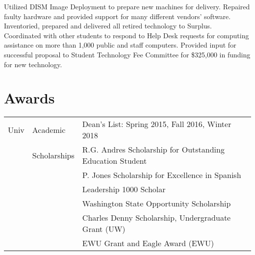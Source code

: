 \documentclass[]{deedy-resume-openfont}
\begin{document}
\begin{minipage}[t]{0.75\textwidth}
\sectionsep

Utilized DISM Image Deployment to prepare new machines for delivery. Repaired faulty hardware and provided support for many different vendors’ software. Inventoried, prepared and delivered all retired technology to Surplus. Coordinated with other students to respond to Help Desk requests for computing assistance on more than 1,000 public and staff computers. Provided input for successful proposal to Student Technology Fee Committee for \$325,000 in funding for new technology.
\sectionsep


\section{Awards} 
\begin{tabular}{rll}
Univ& Academic & Dean's List: Spring 2015, Fall 2016, Winter 2018\\
 & Scholarships & R.G. Andres Scholarship for Outstanding Education Student\\
 & & P. Jones Scholarship for Excellence in Spanish\\
 & & Leadership 1000 Scholar \\
 & & Washington State Opportunity Scholarship\\
 & & Charles Denny Scholarship, Undergraduate Grant (UW)\\
 & & EWU Grant and Eagle Award (EWU)\\


\end{tabular}
\sectionsep



\end{minipage}
\end{document}
